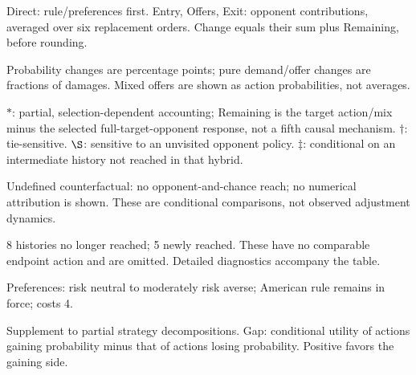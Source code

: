 \documentclass[10pt]{article}
\begin{document}
{\footnotesize Direct: rule/preferences first. Entry, Offers, Exit: opponent contributions, averaged over six replacement orders. Change equals their sum plus Remaining, before rounding.\par
Probability changes are percentage points; pure demand/offer changes are fractions of damages. Mixed offers are shown as action probabilities, not averages.\par
$*$: partial, selection-dependent accounting; Remaining is the target action/mix minus the selected full-target-opponent response, not a fifth causal mechanism. $\dagger$: tie-sensitive. $\S$: sensitive to an unvisited opponent policy. $\ddagger$: conditional on an intermediate history not reached in that hybrid.\par
Undefined counterfactual: no opponent-and-chance reach; no numerical attribution is shown. These are conditional comparisons, not observed adjustment dynamics.\par
8 histories no longer reached; 5 newly reached. These have no comparable endpoint action and are omitted. Detailed diagnostics accompany the table.}\par
{}\par
Preferences: risk neutral to moderately risk averse; American rule remains in force; costs 4.\par
{\small Supplement to partial strategy decompositions. Gap: conditional utility of actions gaining probability minus that of actions losing probability. Positive favors the gaining side.}\par
\end{document}

